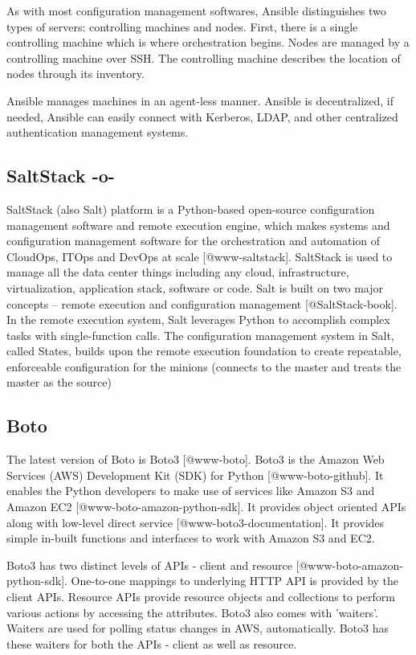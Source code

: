 As with most configuration management softwares, Ansible distinguishes
two types of servers: controlling machines and nodes. First, there is
a single controlling machine which is where orchestration
begins. Nodes are managed by a controlling machine over SSH. The
controlling machine describes the location of nodes through its
inventory.

Ansible manages machines in an agent-less manner. Ansible is
decentralized, if needed, Ansible can easily connect with Kerberos,
LDAP, and other centralized authentication management systems.



\subsection{SaltStack -o-}

SaltStack (also Salt) platform is a Python-based open-source
configuration management software and remote execution engine, which
makes systems and configuration management software for the
orchestration and automation of CloudOps, ITOps and DevOps at
scale [@www-saltstack]. SaltStack is used to manage all the data
center things including any cloud, infrastructure, virtualization,
application stack, software or code. Salt is built on two major
concepts -- remote execution and configuration
management [@SaltStack-book]. In the remote execution system, Salt
leverages Python to accomplish complex tasks with single-function
calls. The configuration management system in Salt, called States,
builds upon the remote execution foundation to create repeatable,
enforceable configuration for the minions (connects to the master and
treats the master as the source)


     
\subsection{Boto}

The latest version of Boto is Boto3 [@www-boto].  Boto3 is the
Amazon Web Services (AWS) Development Kit (SDK) for
Python [@www-boto-github]. It enables the Python developers to
make use of services like Amazon S3 and Amazon
EC2 [@www-boto-amazon-python-sdk].  It provides object oriented
APIs along with low-level direct service
 [@www-boto3-documentation].  It provides simple in-built
functions and interfaces to work with Amazon S3 and EC2.

Boto3 has two distinct levels of APIs - client and resource
 [@www-boto-amazon-python-sdk]. One-to-one mappings to underlying
HTTP API is provided by the client APIs. Resource APIs provide
resource objects and collections to perform various actions by
accessing the attributes.  Boto3 also comes with 'waiters'. Waiters
are used for polling status changes in AWS, automatically. Boto3 has
these waiters for both the APIs - client as well as resource.
     
